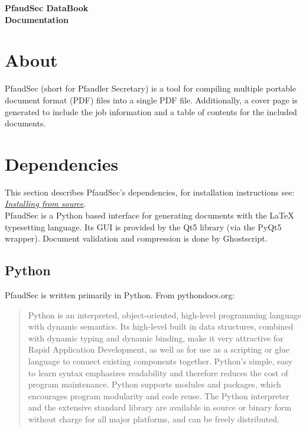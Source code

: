 \documentclass[14pt]{article}
\begin{document}
\setlength\headheight{20pt}
\begin{flushleft}
\fontsize{35}{35}\selectfont\textbf{PfaudSec DataBook\\ Documentation}\\

\normalsize

\setcounter{tocdepth}{2}
\setcounter{secnumdepth}{3}
\startcontents[section]
\begin{center}
\setlength{\parskip}{0.5em}
\setlength{\parskip}{1em}
\end{center}

\newenvironment{subs}
  {\adjustwidth{2em}{0pt}}
  {\endadjustwidth}



\section{About}

PfaudSec (short for Pfaudler Secretary) is a tool for compiling multiple portable document format (PDF) files into a single PDF file.
Additionally, a cover page is generated to include the job information and a table of contents for the included documents.

\section{Dependencies}

This section describes PfaudSec's dependencies, for installation instructions see:
\hyperref[sec:install]{\textit{Installing from source}}.\\[\normalbaselineskip]
PfaudSec is a Python based interface for generating documents with the \LaTeX\xspace typesetting language.
Its GUI is provided by the Qt5 library (via the PyQt5 wrapper).
Document validation and compression is done by Ghostscript.


	\subsection{Python}
PfaudSec is written primarily in Python.
From pythondocs.org:

\begin{quote}
Python is an interpreted, object-oriented, high-level programming language with dynamic semantics. Its high-level built in data structures, combined with dynamic typing and dynamic binding, make it very attractive for Rapid Application Development, as well as for use as a scripting or glue language to connect existing components together. Python's simple, easy to learn syntax emphasizes readability and therefore reduces the cost of program maintenance. Python supports modules and packages, which encourages program modularity and code reuse. The Python interpreter and the extensive standard library are available in source or binary form without charge for all major platforms, and can be freely distributed.\end{quote}


\end{flushleft}
\end{document}
